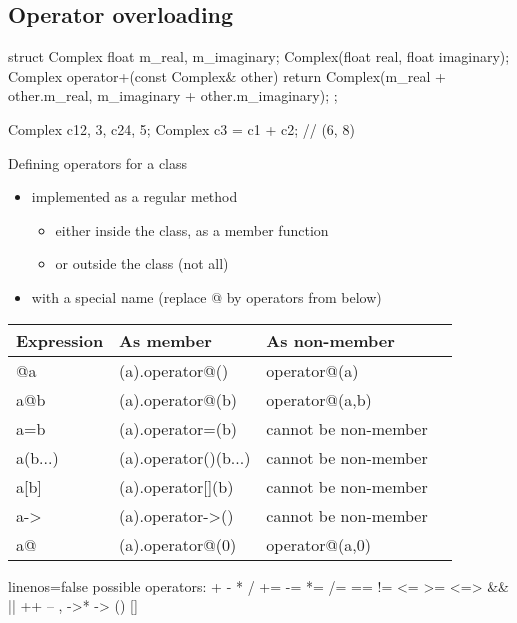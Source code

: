 \subsection[Op]{Operator overloading}

\begin{frame}[fragile]
  \begin{cppcode}
    struct Complex {
      float m_real, m_imaginary;
      Complex(float real, float imaginary);
      Complex operator+(const Complex& other) {
        return Complex(m_real + other.m_real,
                       m_imaginary + other.m_imaginary);
      }
    };

    Complex c1{2, 3}, c2{4, 5};
    Complex c3 = c1 + c2; // (6, 8)
  \end{cppcode}
\end{frame}

\begin{frame}[fragile]
  \begin{block}{Defining operators for a class}
    \begin{itemize}
    \item implemented as a regular method
      \begin{itemize}
      \item \small either inside the class, as a member function
      \item or outside the class (not all)
      \end{itemize}
    \item with a special name (replace @ by operators from below)\small
    \end{itemize}
    \begin{tabular}{llll}
      Expression & As member & As non-member \\
      \hline
      @a & (a).operator@() & operator@(a) \\
      a@b & (a).operator@(b) & operator@(a,b) \\
      a=b & (a).operator=(b) & cannot be non-member \\
      a(b...) & (a).operator()(b...) & cannot be non-member \\
      a[b] & (a).operator[](b) & cannot be non-member \\
      a-\textgreater & (a).operator-\textgreater() & cannot be non-member \\
      a@ & (a).operator@(0) & operator@(a,0) \\
      \hline
    \end{tabular}

    \small
    \begin{cppcode*}{linenos=false}
      possible operators: + - * / %
          += -= *= /= %
          == != <= >= <=> && || ++ -- , ->* -> () []
    \end{cppcode*}
  \end{block}
\end{frame}

